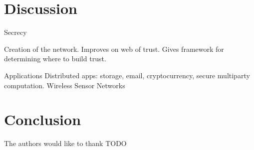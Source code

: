 \documentclass[prodmode,permissions]{acmsmall-ec16}
\begin{document}
\section{Discussion}

Secrecy

Creation of the network.
Improves on web of trust.
Gives framework for determining where to build trust.

Applications
Distributed apps: storage, email, cryptocurrency, secure multiparty computation.
Wireless Sensor Networks

\section{Conclusion}

\begin{acks}
The authors would like to thank TODO
\end{acks}



\end{document}
